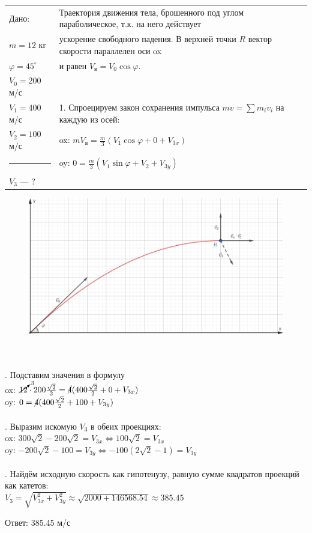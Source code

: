 \documentclass{article}
\begin{document}
\noindent \begin{tabular}{l|l}
    Дано: & Траектория движения тела, брошенного под углом параболическое, т.к. на него действует \\
    $m = 12$ кг & ускорение свободного падения. В верхней точки $R$ вектор скорости параллелен оси ox \\
    $\varphi = 45^{\circ}$ & и равен $V_в = V_0\cos\varphi$. \\
    $V_0 = 200$ м/с & \\
    $V_1 = 400$ м/с & 1. Спроецируем закон сохранения импульса $mv = \sum m_iv_i$ на каждую из осей: \\ 
    $V_2 = 100$ м/с & ox: $mV_в = \frac{m}{3}(V_1\cos\varphi+0+V_{3x})$ \\
    \rule{58px}{0.5pt} & oy: $0 = \frac{m}{3}(V_1\sin\varphi + V_2 + V_{3y})$\\
    $V_3$ --- ? & \\
\end{tabular} \begin{figure}
    \includegraphics[width=\linewidth]{"3_graphics"}
    \end{figure} \\ \, \\
. Подставим значения в формулу \\
\noindent ox: $\cancelto{3}{12}\cdot200\frac{\sqrt{2}}{2} = \cancel{4}(400\frac{\sqrt{2}}{2}+0+V_{3x})$ \\
\noindent oy: $0 = \cancel{4}(400\frac{\sqrt{2}}{2}+100+V_{3y})$ \\ \, \\
. Выразим искомую $V_3$ в обеих проекциях: \\
\noindent ox: $300\sqrt{2} - 200\sqrt{2} = V_{3x} \Leftrightarrow 100\sqrt{2} = V_{3x}$ \\
\noindent oy: $-200\sqrt{2} - 100 = V_{3y} \Leftrightarrow -100(2\sqrt{2}-1) = V_{3y}$ \\ \, \\
. Найдём исходную скорость как гипотенузу, равную сумме квадратов проекций как катетов: \\
\noindent $V_3 = \sqrt{V_{3x}^2 + V_{3y}^2} \approx \sqrt{2000 + 146568.54} \approx 385.45$

\begin{flushright}
Ответ: 385.45 м/с
\end{flushright}
\end{document}

